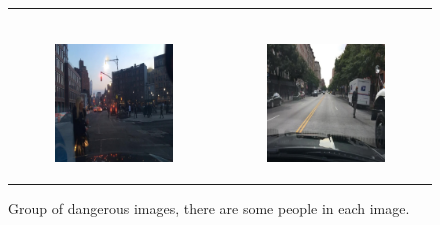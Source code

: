 \begin{figure}
\begin{tabular}{p{\horspace} p{\horspace}}
\begin{subfigure}[b]{\subfigwidth}
    \end{subfigure} \\
    \begin{subfigure}[b]{\subfigwidth}
        \includegraphics[width=\subfigwidth]{images/gpt4/d7.jpg}
    \end{subfigure}
    \hfill &
    \begin{subfigure}[b]{\subfigwidth}
        \includegraphics[width=\subfigwidth]{images/gpt4/d6.jpg}
    \end{subfigure}
\end{tabular}
\caption[Group of dangerous images for image classification.]
{Group of dangerous images, there are some people in each image.}
\label{fig:sub_safe_group}
\end{figure}
